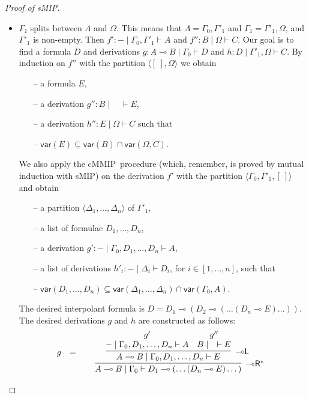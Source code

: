 \documentclass[sn-mathphys-num]{sn-jnl}%
\newcommand{\GG}{\Gamma}
\newcommand{\GD}{\Delta}
\newcommand{\GL}{\Lambda}
\newcommand{\GO}{\Omega}
\newcommand{\vd}{\vdash}
\newcommand{\lolli}{\multimap}
\newcommand{\lleft}{{\lolli}\mathsf{L}}
\newcommand{\lright}{{\lolli}\mathsf{R}}
\newcommand{\proofbox}[1]{\begin{tabular}{l} #1 \end{tabular}}
\newcommand{\mf}[1]{\mathsf{#1}}
\newcommand{\vars}[1]{\mf{var} (#1)}
\newcommand{\sMIP}{\textsf{sMIP}}
\newcommand{\cMMIP}{\textsf{cMMIP}}
\theoremstyle{thmstyleone}%
\theoremstyle{thmstyletwo}%
\theoremstyle{thmstylethree}%
\begin{document}
\begin{proof}[Proof of \sMIP]
\begin{itemize}
    \item $\GG_1$ splits between $\GL$ and $\GO$. 
    This means that $\GL = \GG_0,\GG'_1$ and $\GG_1 = \GG'_1,\GO$, and $\GG'_1$ is non-empty.
    Then $f' : {-} \mid \GG_0,\GG'_1 \vd A$ and $f'': B \mid \GO \vd C$.
    Our goal is to find a formula $D$ and derivations $g : A\lolli B \mid \GG_0 \vd D$ and $h: D \mid \GG'_1, \GO \vd C$.
    By induction on $f''$ with the partition $\langle [\ ] , \GO \rangle$ we obtain
    \begin{itemize}
      \item[--] a formula $E$,
      \item[--] a derivation $g'' : B \mid \quad \vd E$,
      \item[--] a derivation $h'': E \mid \GO \vd C$ such that
      \item[--] $\vars{E} \subseteq \vars{B} \cap \vars{\GO , C}$.
    \end{itemize}
    We also apply the \cMMIP~procedure (which, remember, is proved by mutual induction with \sMIP) on the derivation $f'$ with the partition $\langle \GG_0 , \GG'_1 , [\ ]\rangle$ and obtain
    \begin{itemize}
      \item[--]  a partition $\langle \GD_1, \dots , \GD_n \rangle$ of $\GG'_1$,
      \item[--] a list of formulae $D_1 , \dots , D_n$,
      \item[--] a derivation $g': {-} \mid \GG_0 , D_1, \dots, D_n \vd A$,
      \item[--] a list of derivations $h'_i : {-} \mid \GD_i \vd D_i$, for $i \in [1, \dots, n]$, such that
      \item[--] $\vars{D_1 , \dots , D_n} \subseteq \vars{\GD_1 , \dots , \GD_n} \cap \vars{\GG_0 , A}$.
    \end{itemize}
    The desired interpolant formula is $D = D_1 \lolli (D_2 \lolli (\dots (D_n \lolli E)\dots))$.
    The desired derivations $g$ and $h$ are constructed as follows:
    \begin{displaymath}
      \begin{array}{rcl}
        g 
        &=&
        \proofbox{
        \infer[\lright^*]{A\lolli B \mid \GG_0 \vd D_1 \lolli (\dots (D_n \lolli E)\dots)}{
        \infer[\lleft]{A \lolli B \mid \GG_0 , D_1, \dots, D_n \vd E}{
        \deduce{{-} \mid \GG_0 , D_1, \dots, D_n \vd A}{g'}
        &
        \deduce{B \mid \quad \vd E}{g''}
}}}
\end{array}
\end{displaymath}
\end{itemize}
\end{proof}
\end{document}
